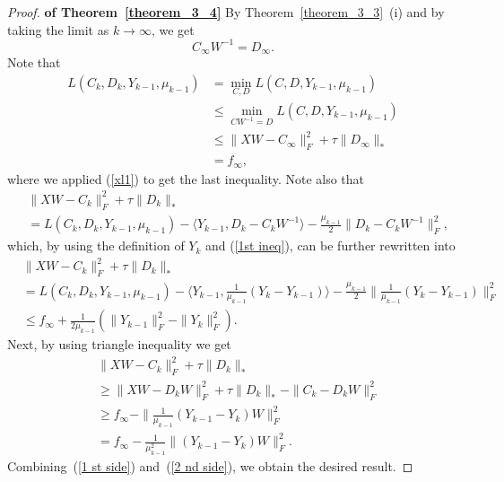 \documentclass[twoside,11pt]{article}
\begin{document}
\begin{proof}{\bf of Theorem~\ref{theorem_3_4}} By Theorem~\ref{theorem_3_3}~(i) and by taking the limit as $k\to \infty$,  we get
\begin{equation}\label{xl1}
C_{\infty}W^{-1}=D_{\infty}.
\end{equation}
Note that
	\begin{align}\label{1st ineq}
	L(C_{k},D_{k},Y_{k-1},\mu_{k-1})&=\min_{C,D}L(C,D,Y_{k-1},\mu_{k-1})\nonumber\\
	&\le \min_{CW^{-1}=D}L(C,D,Y_{k-1},\mu_{k-1})\nonumber\\
	&\le \|XW-C_{\infty}\|_F^2+\tau\|D_{\infty}\|_* \nonumber\\
	&=f_{\infty},
	\end{align}
where we applied (\ref{xl1}) to get the last inequality.	Note also that
	\begin{align*}
	&\|XW-C_{k}\|_F^2+\tau\|D_{k}\|_*\\
	&=L(C_{k},D_{k},Y_{k-1},\mu_{k-1})-\langle Y_{k-1},D_{k}-C_{k}W^{-1}\rangle -\frac{\mu_{k-1}}{2}\|D_{k}-C_{k}W^{-1}\|_F^2,
	\end{align*}
	which, by using the definition of $Y_{k}$ and (\ref{1st ineq}), can be further rewritten into 
	\begin{align}\label{1 st side}
	&\|XW-C_{k}\|_F^2+\tau\|D_{k}\|_*\nonumber\\
	&=L(C_{k},D_{k},Y_{k-1},\mu_{k-1})-\langle Y_{k-1},\frac{1}{\mu_{k-1}}(Y_{k}-Y_{k-1})\rangle -\frac{\mu_{k-1}}{2}\|\frac{1}{\mu_{k-1}}(Y_{k}-Y_{k-1})\|_F^2\nonumber\\
	&\le f_{\infty}+\frac{1}{2\mu_{k-1}}(\|Y_{k-1}\|_F^2-\|Y_{k}\|_F^2).
	\end{align}
	Next, by using triangle inequality we get
	\begin{align}\label{2 nd side}
	&\|XW-C_{k}\|_F^2+\tau\|D_{k}\|_*\nonumber\\
	&\ge\|XW-D_{k}W\|_F^2+\tau\|D_{k}\|_*-\|C_{k}-D_{k}W\|_F^2\nonumber\\
	&\ge f_{\infty}-\|\frac{1}{\mu_{k-1}}(Y_{k-1}-Y_{k})W\|_F^2\nonumber\\
	&=f_{\infty}-\frac{1}{\mu_{k-1}^2}\|(Y_{k-1}-Y_{k})W\|_F^2.
	\end{align}
	Combining~(\ref{1 st side}) and~(\ref{2 nd side}), we obtain the desired result.
	\end{proof}



\end{document}
